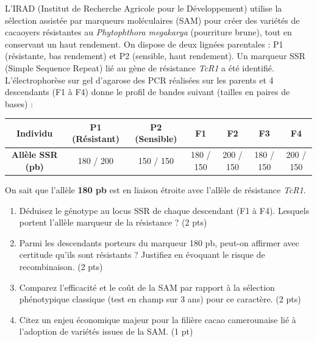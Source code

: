 \documentclass[11pt]{article}
\begin{document}
\begin{exercice}
L'IRAD (Institut de Recherche Agricole pour le Développement) utilise la sélection assistée par marqueurs moléculaires (SAM) pour créer des variétés de cacaoyers résistantes au \textit{Phytophthora megakarya} (pourriture brune), tout en conservant un haut rendement. On dispose de deux lignées parentales : P1 (résistante, bas rendement) et P2 (sensible, haut rendement). Un marqueur SSR (Simple Sequence Repeat) lié au gène de résistance \textit{TcR1} a été identifié. L'électrophorèse sur gel d'agarose des PCR réalisées sur les parents et 4 descendants (F1 à F4) donne le profil de bandes suivant (tailles en paires de bases) :

\begin{center}
\begin{tabular}{c|c|c|c|c|c|c}
\toprule
\textbf{Individu} & \textbf{P1 (Résistant)} & \textbf{P2 (Sensible)} & \textbf{F1} & \textbf{F2} & \textbf{F3} & \textbf{F4} \\
\midrule
\textbf{Allèle SSR (pb)} & 180 / 200 & 150 / 150 & 180 / 150 & 200 / 150 & 180 / 150 & 200 / 150 \\
\bottomrule
\end{tabular}
\end{center}
On sait que l'allèle \textbf{180 pb} est en liaison étroite avec l'allèle de résistance \textit{TcR1}.

\begin{enumerate}
    \item Déduisez le génotype au locus SSR de chaque descendant (F1 à F4). Lesquels portent l'allèle marqueur de la résistance ? (2 pts)
    \item Parmi les descendants porteurs du marqueur 180 pb, peut-on affirmer avec certitude qu'ils sont résistants ? Justifiez en évoquant le risque de recombinaison. (2 pts)
    \item Comparez l'efficacité et le coût de la SAM par rapport à la sélection phénotypique classique (test en champ sur 3 ans) pour ce caractère. (2 pts)
    \item Citez un enjeu économique majeur pour la filière cacao camerounaise lié à l'adoption de variétés issues de la SAM. (1 pt)
\end{enumerate}
\end{exercice}
\end{document}
